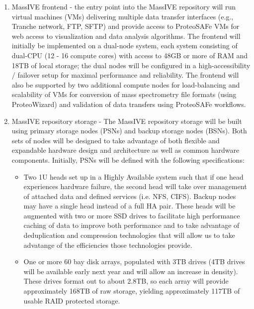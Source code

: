 \documentclass[arial,11pt]{article}
\begin{document}
\begin{enumerate}
\item MassIVE frontend - the entry point into the MassIVE repository will run virtual machines (VMs) delivering multiple data transfer interfaces (e.g., Tranche network, FTP, SFTP) and provide access to ProteoSAFe VMs for web access to visualization and data analysis algorithms. The frontend will initially be implemented on a dual-node system, each system consisting of dual-CPU (12 - 16 compute cores) with access to 48GB or more of RAM and 18TB of local storage; the dual nodes will be configured in a high-accessibility / failover setup for maximal performance and reliability. The frontend will also be supported by two additional compute nodes for load-balancing and scalability of VMs for conversion of mass spectrometry file formats (using ProteoWizard) and validation of data transfers using ProteoSAFe workflows.

\item MassIVE repository storage - The MassIVE repository storage will be built using primary storage nodes (PSNs) and backup storage nodes (BSNs). Both sets of nodes will be designed to take advantage of both flexible and expandable hardware design and architecture as well as common hardware components. Initially, PSNs will be defined with the following specifications:

\begin{itemize}

    \item Two 1U heads set up in a Highly Available system such that if one head experiences hardware failure, the second head will take over management of attached data and defined services (i.e. NFS, CIFS). Backup nodes may have a single head instead of a full HA pair. These heads will be augmented with two or more SSD drives to facilitate high performance caching of data to improve both performance and to take advantage of deduplication and compression technologies that will allow us to take advatange of the efficiencies those technologies provide.

    \item One or more 60 bay disk arrays, populated with 3TB drives (4TB drives will be available early next year and will allow an increase in density). These drives format out to about 2.8TB, so each array will provide approximately 168TB of raw storage, yielding approximately 117TB of usable RAID protected storage.


\end{itemize}
\end{enumerate}
\end{document}
